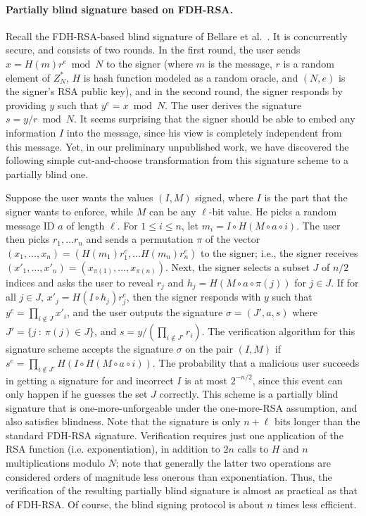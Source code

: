 \paragraph{Partially blind signature based on FDH-RSA.} Recall the FDH-RSA-based blind signature of Bellare et al.~\cite{JC:BNPS03}. It is concurrently secure, and consists of two rounds.  In the first round, the user sends $x=H(m)r^e \bmod N$ to the signer (where $m$ is the message, $r$ is a random element of $Z_N^*$, $H$ is hash function modeled as a random oracle, and $(N,e)$ is the signer's RSA public key), and in the second round, the signer responds by providing $y$ such that $y^e=x\bmod N$.  The user derives the signature $s = y/r \bmod N$.  It seems surprising that the signer should be able to embed any information $I$ into the message, since his view is completely independent from this message.  Yet, in our preliminary unpublished work, we have discovered the following simple cut-and-choose transformation from this signature scheme to a partially blind one.  

Suppose the user wants the values $(I,M)$ signed, where $I$ is the part that the signer wants to enforce, while $M$ can be any $\ell$-bit value.  
He picks a random message ID $a$ of length $\ell$.  
For $1\leq i \leq n$, let $m_i = I \circ H(M\circ a \circ i)$.  
The user then picks $r_1,\ldots r_n$ and sends a permutation $\pi$ of the vector $(x_1,\ldots,x_n) = (H(m_1)r_1^e,\ldots H(m_n)r_n^e)$ to the signer; 
i.e., the signer receives $(x'_1,\ldots,x'_n)=(x_{\pi(1)},\ldots,x_{\pi(n)})$.  Next, the signer selects a subset $J$ of $n/2$ indices and asks the user to reveal $r_j$ and $h_j = H(M\circ a \circ \pi(j))$ for $j\in J$.  If for all $j \in J$, $x'_j = H(I \circ h_j)r_j^e$, then  the signer responds with $y$ such that $y^e = \prod_{i\notin J} x'_i$, and the user outputs the signature $\sigma = (J',a,s)$ where $J' = \{j~:~\pi(j)\in J\}$, and $s = y/(\prod_{i \notin J'}r_i)$.  The verification algorithm for this signature scheme accepts the signature $\sigma$ on the pair $(I,M)$ if $s^e = \prod_{i \notin J'} H(I \circ H(M\circ a \circ i))$.  The probability that a malicious user succeeds in getting a signature for and incorrect $I$ is at most $2^{-n/2}$, since this event can only happen if he guesses the set $J$ correctly.  This scheme is a partially blind signature that is one-more-unforgeable under the one-more-RSA assumption, and also satisfies blindness.  Note that the signature is only $n+\ell$ bits longer than the standard FDH-RSA signature.  Verification requires just one application of the RSA function (i.e. exponentiation), in addition to $2n$ calls to $H$ and $n$ multiplications modulo $N$; note that generally the latter two operations are considered orders of magnitude less onerous than exponentiation.  Thus, the verification of the resulting partially blind signature is almost as practical as that of FDH-RSA.  Of course, the blind signing protocol is about $n$ times less efficient.

